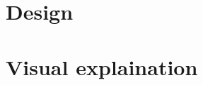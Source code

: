 \documentclass{article}
\begin{document}
\section{Design}
\label{sec:Design}

\section{Visual explaination}


\end{document}
